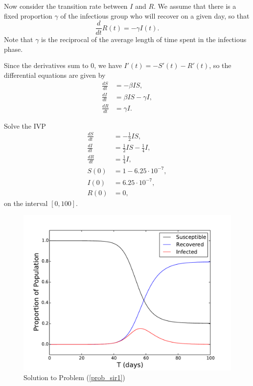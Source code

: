  Now consider the transition rate between $I$ and $R$. We assume that there is a fixed proportion $\gamma$ of the infectious group who will recover on a given day, so that 
 \[\frac{d}{dt}R(t) = -\gamma I(t).\]
 Note that $\gamma$ is the reciprocal of the average length of time spent in the infectious phase.
 
 Since the derivatives sum to $0$, we have $I'(t) = - S'(t) - R'(t)$, so the  differential equations are given by
\begin{align*}
\frac{dS}{dt} &=-\beta IS ,\\
\frac{dI}{dt} &= \beta I S-\gamma I,\\
\frac{dR}{dt} &=\gamma I.
\end{align*}


\begin{problem}
Solve the IVP
\begin{align*}
\frac{dS}{dt} &=-\frac{1}{2} IS ,\\
\frac{dI}{dt} &= \frac{1}{2} I S-\frac{1}{4} I, \\
\frac{dR}{dt} &=\frac{1}{4} I,\\
S(0) &= 1-6.25\cdot10^{-7},\\
I(0) &= 6.25\cdot10^{-7},\\
R(0) &=0,
\end{align*}
on the interval $[0,100]$. \label{prob_sir1}
\end{problem}

\begin{figure}[ht]
\centering
\includegraphics[width=\textwidth]{SIR1.pdf}
\caption{Solution to Problem (\ref{prob_sir1}) }
\label{sir1}
\end{figure}

